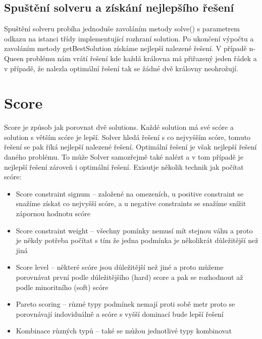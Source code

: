 \subsection{Spuštění solveru a získání nejlepšího řešení}
Spuštění solveru probíha jednoduše zavoláním metody solve() s parametrem odkazu na istanci třídy implementující rozhraní solution. Po ukončení výpočtu a zavoláním metody getBestSolution získáme nejlepší nalezené řešení. V případě n-Queen problému nám vrátí řešení kde každá královna má přiřazený jeden řádek a v případě, že nalezla optimální řešení tak se žádné dvě královny neohrožují.

\section{Score}\label{score}
Score je způsob jak porovnat dvě solutions. Každé solution má své scóre a solution s větším scóre je lepší. Solver hledá řešení s co nejvyšším scóre, tomuto řešení se pak říká nejlepší nalezené řešení. Optimální řešení je však nejlepší řešení daného problému. To může Solver samozřejmě také nalézt a v tom případě je nejlepší řešení zároveň i optimální řešení. Exisutje několik technik jak počítat scóre:
\begin{itemize}
\item Score constraint signum -- založené na omezeních, u positive constraint se snažíme získat co nejvyšší scóre, a u negative constraints se snažíme snížit zápornou hodnotu scóre
\item Score constraint weight -- všechny pomínky nemusí mít stejnou váhu a proto je někdy potřeba počítat s tím že jedna podmínka je několikrát důležitější než jiná
\item Score level -- některé scóre jsou důležitější než jiné a proto můžeme porovnávat první podle dúležitějšího (hard) score a pak se rozhodnout až podle minoritního (soft) scóre
\item Pareto scoring -- různé typy podmínek nemají proti sobě metr proto se porovnávají indoviduálně a scóre s vyšší dominací bude lepší řešení
\item Kombinace různých typů -- také se můžou jednotlivé typy kombinovat
 
\end{itemize}

